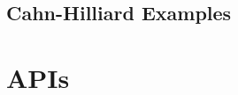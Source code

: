 \documentclass[letterpaper]{book}
\begin{document}
\chapter{Cahn-Hilliard Examples}


\newpage


% 
% 
% 
% 
% 
 
\appendix

\part{APIs}


\parttoc




\backmatter


\printindex
\end{document}
